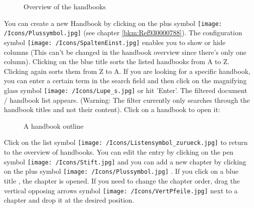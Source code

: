 \begin{figure}[H]
\caption{Overview of the handbooks}
\end{figure}

You can create a new Handbook by clicking on the plus symbol \texttt{[image: /Icons/Plussymbol.jpg]}  (see chapter \ref{bkm:Ref930000788}). The configuration symbol \texttt{[image: /Icons/SpaltenEinst.jpg]}  enables you to show or hide columns (This can't be changed in the handbook overview since there's only one column). Clicking on the blue title  sorts the listed handbooks from A to Z. Clicking again sorts them from Z to A. If you are looking for a specific handbook, you can enter a certain term in the search field  and then click on the magnifying glass symbol \texttt{[image: /Icons/Lupe\_s.jpg]} or hit 'Enter'. The filtered document / handbook list appears. (Warning: The filter currently only searches through the handbook titles and not their content). Click on a handbook  to open it:

\begin{figure}[H]
\caption{A handbook outline}
\end{figure}

Click on the list symbol \texttt{[image: /Icons/Listensymbol\_zurueck.jpg]}  to return to the overview of handbooks. You can edit the entry by clicking on the pen symbol \texttt{[image: /Icons/Stift.jpg]}  and you can add a new chapter by clicking on the plus symbol \texttt{[image: /Icons/Plussymbol.jpg]} . If you click on a blue title , the chapter is opened. If you need to change the chapter order, drag the vertical opposing arrows symbol \texttt{[image: /Icons/VertPfeile.jpg]}  next to a chapter and drop it at the desired position.

